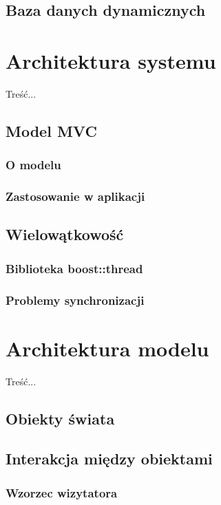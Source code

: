 {\subsection{Baza danych dynamicznych}
\par{
}

\section[Architektura systemu][Architektura systemu]{Architektura systemu}
\par{ Treść... }
\subsection{Model MVC}
\subsubsection{O modelu}
\subsubsection{Zastosowanie w aplikacji}
\subsection{Wielowątkowość}
\subsubsection{Biblioteka boost::thread}
\subsubsection{Problemy synchronizacji}

\section[Architektura modelu][Architektura modelu]{Architektura modelu}
\par{ Treść... }
\subsection{Obiekty świata}
\subsection{Interakcja między obiektami}
\subsubsection{Wzorzec wizytatora}
}
